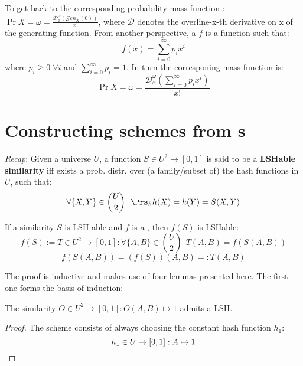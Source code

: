 To get back to the corresponding probability mass function : $\displaystyle \Pr{X = \omega} = \frac{\mathcal{D}_x^\omega(\mathcal{G}en_X(0))}{x!}$, where $\mathcal{D}$ denotes the overline-x-th derivative on x of the generating function. From another perspective, a \pgf{} $f$ is a function such that:
\[
	f(x) = \sum_{i = 0}^{\infty} p_i x^i
\]
where $p_i \geq 0\; \forall i$ and $\sum_{i = 0}^{\infty} p_i = 1$. In turn the corresponing mass function is:
\[
	\Pr{X = \omega} = \frac{\mathcal{D}_x^\omega(\sum_{i = 0}^{\infty} p_i x^i)}{x!}
\]


\section{Constructing schemes from \pgf s}

\textit{Recap}: Given a universe $U$, a function $S \in U^2 \to [0, 1]$ is said to be a \textbf{LSHable similarity} iff exists a prob. distr. over (a family/subset of) the hash functions in $U$, such that: 
\begin{equation}
\forall \{X, Y\} \in \binom{U}{2}\ \ \Prs_h{h(X)=h(Y)} = S(X, Y)
\end{equation}

\begin{thm} \label{t:pgf_1}
	If a similarity $S$ is LSH-able and $f$ is a \pgf, then $f(S)$ is LSHable:
	\[
		f(S) := T \in U^2 \to [0, 1] : \forall \{A, B\} \in \binom{U}{2}\ \ T(A, B) = f(S(A, B))
	\]
	\[
		f(S(A, B)) = (f(S)) (A, B) =: T (A,B)
	\]
\end{thm}



The proof is inductive and makes use of four lemmas presented here. The first one forms the basis of induction:
\begin{lem}[L1]\label{l:pgf_1}
	The similarity $O \in U^2 \to [0, 1] : O(A, B) \mapsto 1$ admits a LSH.
\end{lem}

\begin{proof}
	The scheme consists of always choosing the constant hash function $h_1$:
	\[
		h_1 \in U \to [0, 1] : A \mapsto 1 \qedhere
	\]
\end{proof}


